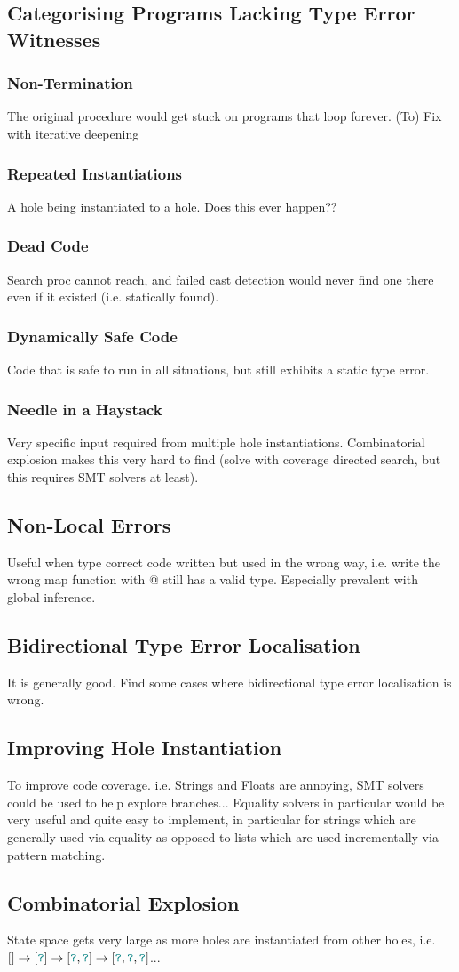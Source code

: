 \subsection{Categorising Programs Lacking Type Error Witnesses}
\subsubsection{Non-Termination}
The original procedure would get stuck on programs that loop forever. (To) Fix with iterative deepening
\subsubsection{Repeated Instantiations}
A hole being instantiated to a hole. Does this ever happen??
\subsubsection{Dead Code}
Search proc cannot reach, and failed cast detection would never find one there even if it existed (i.e. statically found).
\subsubsection{Dynamically Safe Code}
Code that is safe to run in all situations, but still exhibits a static type error.

\subsubsection{Needle in a Haystack}
Very specific input required from multiple hole instantiations. Combinatorial explosion makes this very hard to find (solve with coverage directed search, but this requires SMT solvers at least).

\subsection{Non-Local Errors}
Useful when type correct code written but used in the wrong way, i.e. write the wrong map function with @ still has a valid type. Especially prevalent with global inference.
\subsection{Bidirectional Type Error Localisation}
It is generally good. Find some cases where bidirectional type error localisation is wrong.
\subsection{Improving Hole Instantiation}
To improve code coverage. i.e. Strings and Floats are annoying, SMT solvers could be used to help explore branches... Equality solvers in particular would be very useful and quite easy to implement, in particular for strings which are generally used via equality as opposed to lists which are used incrementally via pattern matching.
\subsection{Combinatorial Explosion}
State space gets very large as more holes are instantiated from other holes, i.e. $[] \to [{\color{teal}\texttt{?}}] \to [{\color{teal}\texttt{?}}, {\color{teal}\texttt{?}}] \to [{\color{teal}\texttt{?}},{\color{teal}\texttt{?}},{\color{teal}\texttt{?}}]$...
